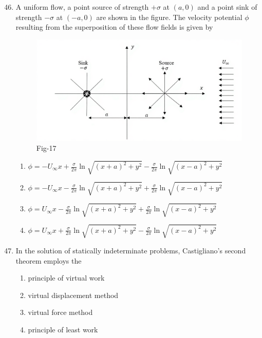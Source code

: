 \documentclass[journal]{IEEEtran}
\theoremstyle{remark}
\begin{document}
\newpage
\vspace*{0.25cm}

\begin{enumerate}[itemsep=1em]
\setcounter{enumi}{45}
\item A uniform flow, a point source of strength $+\sigma$  at $(a,0)$ and a point sink of strength $-\sigma$ at $(-a,0)$ are shown in the figure. The velocity potential $\phi$ resulting from the superposition of these flow fields is given by 
\begin{figure}[H]
    \centering
    \includegraphics[width=0.4\columnwidth]{figs/fig-17.png}
    \caption*{Fig-17}
    \label{fig-17}
\end{figure}

\begin{enumerate}[leftmargin=2.5em, labelsep=0.5em, itemsep=0.5em]
    \item $\phi = -U_{\infty} x 
+ \frac{\sigma}{2\pi} \ln\sqrt{(x+a)^2 + y^2} 
- \frac{\sigma}{2\pi} \ln\sqrt{(x-a)^2 + y^2}$
    \item $\phi = -U_{\infty} x 
- \frac{\sigma}{2\pi} \ln\sqrt{(x+a)^2 + y^2} 
+ \frac{\sigma}{2\pi} \ln\sqrt{(x-a)^2 + y^2}$
     \item $\phi = U_{\infty} x 
- \frac{\sigma}{2\pi} \ln\sqrt{(x+a)^2 + y^2} 
+ \frac{\sigma}{2\pi} \ln\sqrt{(x-a)^2 + y^2}$
    \item $\phi = U_{\infty} x 
+ \frac{\sigma}{2\pi} \ln\sqrt{(x+a)^2 + y^2} 
- \frac{\sigma}{2\pi} \ln\sqrt{(x-a)^2 + y^2}$

\end{enumerate}



\end{enumerate}

\begin{enumerate}[itemsep=1em]
\setcounter{enumi}{46}
\item In the solution of statically indeterminate problems, Castigliano's second theorem employs the

\begin{enumerate}[ leftmargin=2.5em, labelsep=0.5em, itemsep=0.5em]
    \item principle of virtual work 
    \item virtual displacement method 
    \item virtual force method 
    \item principle of least work
\end{enumerate}

\end{enumerate}
\end{document}
